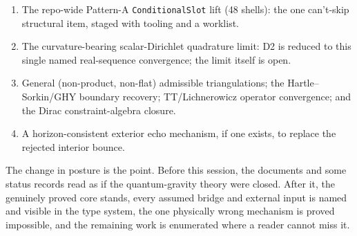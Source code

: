 \documentclass[11pt,letterpaper]{article}
\begin{document}
\begin{enumerate}[nosep]
\item The repo-wide Pattern-A \texttt{ConditionalSlot} lift (48 shells): the one
can't-skip structural item, staged with tooling and a worklist.
\item The curvature-bearing scalar-Dirichlet quadrature limit: D2 is reduced to
this single named real-sequence convergence; the limit itself is open.
\item General (non-product, non-flat) admissible triangulations; the
Hartle--Sorkin/GHY boundary recovery; TT/Lichnerowicz operator convergence; and
the Dirac constraint-algebra closure.
\item A horizon-consistent exterior echo mechanism, if one exists, to replace the
rejected interior bounce.
\end{enumerate}

The change in posture is the point. Before this session, the documents and some
status records read as if the quantum-gravity theory were closed. After it, the
genuinely proved core stands, every assumed bridge and external input is named
and visible in the type system, the one physically wrong mechanism is proved
impossible, and the remaining work is enumerated where a reader cannot miss it.
\end{document}
